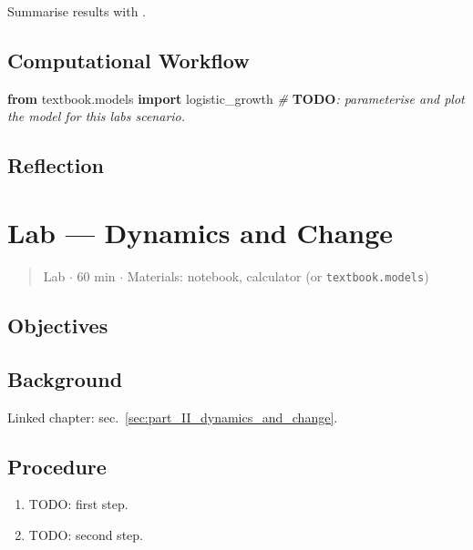 \documentclass[
]{article}
\newenvironment{Shaded}{}{}
\newcommand{\AlertTok}[1]{\textcolor[rgb]{1.00,0.00,0.00}{\textbf{#1}}}
\newcommand{\CommentTok}[1]{\textcolor[rgb]{0.38,0.63,0.69}{\textit{#1}}}
\newcommand{\ImportTok}[1]{\textcolor[rgb]{0.00,0.50,0.00}{\textbf{#1}}}
\newcommand{\NormalTok}[1]{#1}
\theoremstyle{plain}
\theoremstyle{definition}
\begin{document}
Summarise results with .

\subsection{Computational Workflow}\label{computational-workflow-6}

\begin{Shaded}
\begin{Highlighting}[]
\ImportTok{from}\NormalTok{ textbook.models }\ImportTok{import}\NormalTok{ logistic\_growth}
\CommentTok{\# }\AlertTok{TODO}\CommentTok{: parameterise and plot the model for this lab\textquotesingle{}s scenario.}
\end{Highlighting}
\end{Shaded}

\subsection{Reflection}\label{reflection-6}

\newpage

\section{Lab --- Dynamics and
Change}\label{sec:lab_part_II_dynamics_and_change}

\begin{quote}
Lab \texorpdfstring{\ensuremath{\cdot}}{.} 60 min \texorpdfstring{\ensuremath{\cdot}}{.} Materials: notebook, calculator (or
\texttt{textbook.models})
\end{quote}

\subsection{Objectives}\label{objectives-7}

\subsection{Background}\label{background-7}

Linked chapter: sec.~\ref{sec:part_II_dynamics_and_change}.

\subsection{Procedure}\label{procedure-7}

\begin{enumerate}
\def\labelenumi{\arabic{enumi}.}
\item
  TODO: first step.
\item
  TODO: second step.
\end{enumerate}
\end{document}
